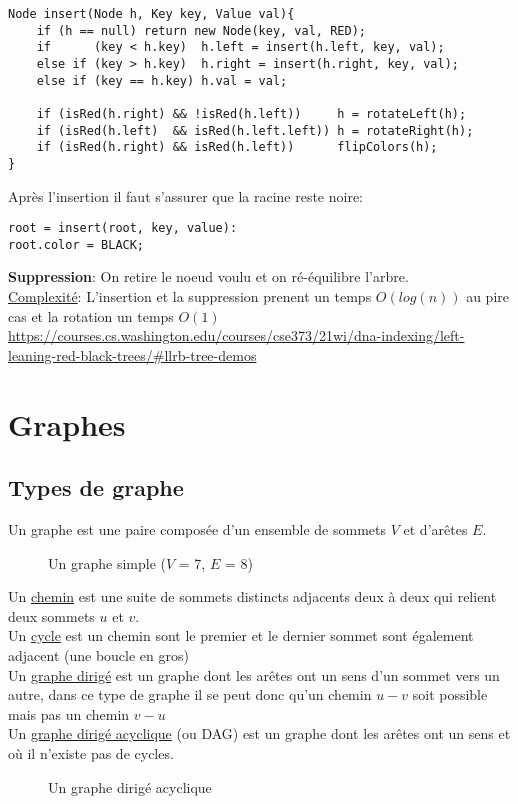 \documentclass[10pt]{article}
\begin{document}
\begin{verbatim}
Node insert(Node h, Key key, Value val){
	if (h == null) return new Node(key, val, RED);
	if      (key < h.key)  h.left = insert(h.left, key, val);
	else if (key > h.key)  h.right = insert(h.right, key, val);
	else if (key == h.key) h.val = val;
	
	if (isRed(h.right) && !isRed(h.left))     h = rotateLeft(h);
	if (isRed(h.left)  && isRed(h.left.left)) h = rotateRight(h);
	if (isRed(h.right) && isRed(h.left))      flipColors(h);
}
\end{verbatim}
Après l'insertion il faut s'assurer que la racine reste noire:
\begin{verbatim}
root = insert(root, key, value):
root.color = BLACK;
\end{verbatim}
\textbf{Suppression}: On retire le noeud voulu et on ré-équilibre l'arbre.
\\\underline{Complexité}: L'insertion et la suppression prenent un temps $O(log(n))$ au pire cas et la rotation un temps $O(1)$
\\\url{https://courses.cs.washington.edu/courses/cse373/21wi/dna-indexing/left-leaning-red-black-trees/#llrb-tree-demos}
\section{Graphes}
\subsection{Types de graphe}
Un graphe est une paire composée d'un ensemble de sommets $V$ et d'arêtes $E$.

\begin{figure}[H]
\caption{Un graphe simple ($V$ = 7, $E$ = 8)}
\label{fig:graph}
\end{figure}

Un \underline{chemin} est une suite de sommets distincts adjacents deux à deux qui relient deux sommets $u$ et $v$.
\\Un \underline{cycle} est un chemin sont le premier et le dernier sommet sont également adjacent (une boucle en gros)
\\ Un \underline{graphe dirigé} est un graphe dont les arêtes ont un sens d'un sommet vers un autre, dans ce type de graphe il se peut donc qu'un chemin $u-v$ soit possible mais pas un chemin $v-u$
\\Un \underline{graphe dirigé acyclique} (ou DAG) est un graphe dont les arêtes ont un sens et où il n'existe pas de cycles.
\begin{figure}[H]
\caption{Un graphe dirigé acyclique}
\label{fig:dag}
\end{figure}
\end{document}
